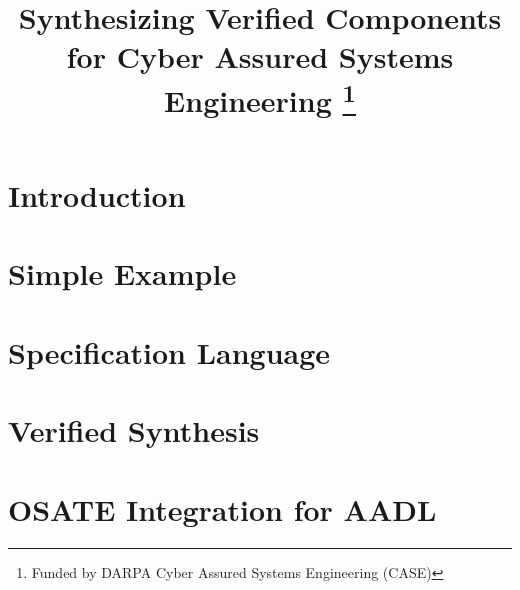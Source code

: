 \documentclass[conference]{IEEEtran}
\begin{document}
\title{
  Synthesizing Verified Components for Cyber Assured Systems Engineering 
  \thanks{
    Funded by DARPA Cyber Assured Systems Engineering (CASE)
  }
}


\author{
\and
{}
}


\maketitle

\begin{abstract}

\end{abstract}

\IEEEpeerreviewmaketitle

\section{Introduction}


\section{Simple Example}


\section{Specification Language}


\section{Verified Synthesis}


\section{OSATE Integration for AADL}

\end{document}
